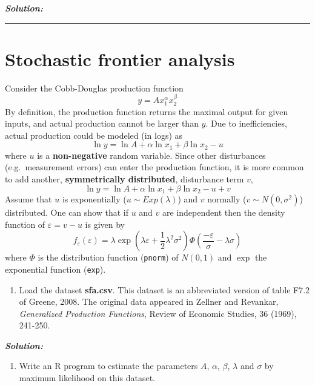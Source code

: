 \documentclass[]{article}
\providecommand{\tightlist}{%
  \setlength{\itemsep}{0pt}\setlength{\parskip}{0pt}}
\begin{document}
\textbf{\emph{Solution:}}

\pagebreak

\begin{center}\rule{0.5\linewidth}{\linethickness}\end{center}

\section{Stochastic frontier
analysis}\label{stochastic-frontier-analysis}

Consider the Cobb-Douglas production function \[
y=Ax_{1}^{\alpha }x_{2}^{\beta }
\] By definition, the production function returns the maximal output for
given inputs, and actual production cannot be larger than \(y\). Due to
inefficiencies, actual production could be modeled (in logs) as \[
\ln y=\ln A+\alpha \ln x_{1}+\beta \ln x_{2}-u
\] where \(u\) is a \textbf{non-negative} random variable. Since other
disturbances (e.g.~measurement errors) can enter the production
function, it is more common to add another, \textbf{symmetrically
distributed}, disturbance term \(v\), \[
\ln y=\ln A+\alpha \ln x_{1}+\beta \ln x_{2}-u+v
\] Assume that \(u\) is exponentially (\(u \sim Exp(\lambda)\)) and
\(v\) normally (\(v\sim N(0,\sigma^{2})\)) distributed. One can show
that if \(u\) and \(v\) are independent then the density function of
\(\varepsilon =v-u\) is given by \[
f_{\varepsilon} (\varepsilon) =\lambda \exp\left(\lambda \varepsilon + \frac{1}{2} \lambda^{2} \sigma^{2}\right) \Phi \left( \frac{-\varepsilon}{\sigma} -\lambda \sigma \right)
\] where \(\Phi\) is the distribution function (\texttt{pnorm}) of
\(N(0,1)\) and \(\exp\) the exponential function (\texttt{exp}).

\begin{enumerate}
\def\labelenumi{\arabic{enumi}.}
\tightlist
\item
  Load the dataset \textbf{sfa.csv}. This dataset is an abbreviated
  version of table F7.2 of Greene, 2008. The original data appeared in
  Zellner and Revankar, \emph{Generalized Production Functions}, Review
  of Economic Studies, 36 (1969), 241-250.
\end{enumerate}

\textbf{\emph{Solution:}}

\begin{enumerate}
\def\labelenumi{\arabic{enumi}.}
\setcounter{enumi}{1}
\tightlist
\item
  Write an R program to estimate the parameters \(A\), \(\alpha\),
  \(\beta\), \(\lambda\) and \(\sigma\) by maximum likelihood on this
  dataset.
\end{enumerate}
\end{document}
